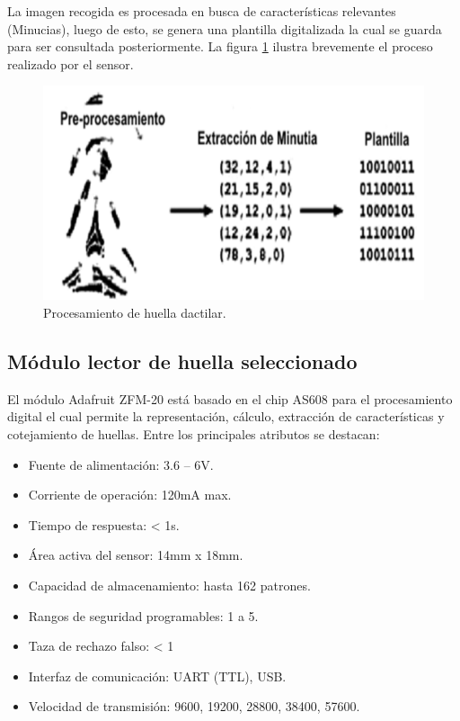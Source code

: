 La imagen recogida es procesada en busca de características relevantes (Minucias), luego de esto, se genera una plantilla digitalizada la cual se guarda para ser consultada posteriormente.
La figura \ref{fig:huella} ilustra brevemente el proceso realizado por el sensor.

\begin{figure}[H]
	\centering
	\includegraphics[scale=.15]{./Figures/huella.png}
	\caption{Procesamiento de huella dactilar.}
	\label{fig:huella}
\end{figure}

\subsection{Módulo lector de huella seleccionado}
El módulo Adafruit ZFM-20 está basado en el chip AS608 para el procesamiento digital el cual permite la representación, cálculo, extracción de características y  cotejamiento de huellas.
Entre los principales atributos se destacan:

\begin{itemize}
\item Fuente de alimentación: 3.6 – 6V. 
\item Corriente de operación: 120mA max.
\item Tiempo de respuesta: < 1s.
\item Área activa del sensor: 14mm x 18mm.
\item Capacidad de almacenamiento: hasta 162 patrones.
\item Rangos de seguridad programables: 1 a 5.
\item Taza de rechazo falso: < 1 %
\item Interfaz de comunicación: UART (TTL), USB.
\item Velocidad de transmisión: 9600, 19200, 28800, 38400, 57600.
\end{itemize}

